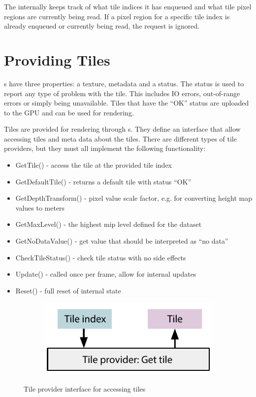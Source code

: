 The  internally keeps track of what tile indices it has enqueued and what tile pixel regions are currently being read. If a pixel region for a specific tile index is already enqueued or currently being read, the request is ignored. 


\section{Providing Tiles}
s have three properties: a texture, metadata and a status. The status is used to report any type of problem with the tile. This includes IO errors, out-of-range errors or simply being unavailable. Tiles that have the ``OK'' status are uploaded to the GPU and can be used for rendering. 

Tiles are provided for rendering through s. They define an interface that allow accessing tiles and meta data about the tiles. There are different types of tile providers, but they must all implement the following functionality:

\begin{itemize}
\item GetTile() - access the tile at the provided tile index
\item GetDefaultTile() - returns a default tile with status ``OK''
\item GetDepthTransform() - pixel value scale factor, e.g. for converting height map values to meters
\item GetMaxLevel() - the highest mip level defined for the dataset
\item GetNoDataValue() - get value that should be interpreted as ``no data''
\item CheckTileStatus() - check tile status with no side effects
\item Update() - called once per frame, allow for internal updates
\item Reset() - full reset of internal state
\end{itemize}

\begin{figure}[htbp]
    \centering
    \begin{subfigure}[bt]{0.4\textwidth}
        \includegraphics[width=\textwidth]{figures/implementation/tileprovider/tileprovider_gettile.pdf}
    \end{subfigure}
    \caption{Tile provider interface for accessing tiles}
    \label{fig:tileprovider}
\end{figure}

